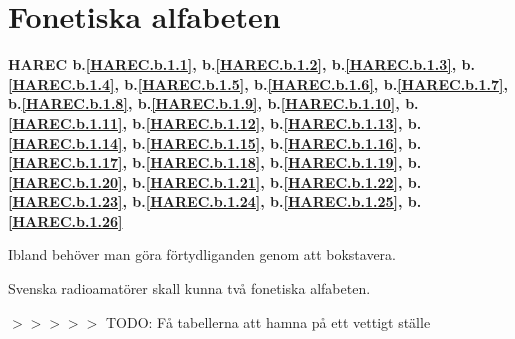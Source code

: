 \section{Fonetiska alfabeten}
\textbf{
HAREC b.\ref{HAREC.b.1.1}\label{myHAREC.b.1.1},
 b.\ref{HAREC.b.1.2}\label{myHAREC.b.1.2},
 b.\ref{HAREC.b.1.3}\label{myHAREC.b.1.3},
 b.\ref{HAREC.b.1.4}\label{myHAREC.b.1.4},
 b.\ref{HAREC.b.1.5}\label{myHAREC.b.1.5},
 b.\ref{HAREC.b.1.6}\label{myHAREC.b.1.6},
 b.\ref{HAREC.b.1.7}\label{myHAREC.b.1.7},
 b.\ref{HAREC.b.1.8}\label{myHAREC.b.1.8},
 b.\ref{HAREC.b.1.9}\label{myHAREC.b.1.9},
 b.\ref{HAREC.b.1.10}\label{myHAREC.b.1.10},
 b.\ref{HAREC.b.1.11}\label{myHAREC.b.1.11},
 b.\ref{HAREC.b.1.12}\label{myHAREC.b.1.12},
 b.\ref{HAREC.b.1.13}\label{myHAREC.b.1.13},
 b.\ref{HAREC.b.1.14}\label{myHAREC.b.1.14},
 b.\ref{HAREC.b.1.15}\label{myHAREC.b.1.15},
 b.\ref{HAREC.b.1.16}\label{myHAREC.b.1.16},
 b.\ref{HAREC.b.1.17}\label{myHAREC.b.1.17},
 b.\ref{HAREC.b.1.18}\label{myHAREC.b.1.18},
 b.\ref{HAREC.b.1.19}\label{myHAREC.b.1.19},
 b.\ref{HAREC.b.1.20}\label{myHAREC.b.1.20},
 b.\ref{HAREC.b.1.21}\label{myHAREC.b.1.21},
 b.\ref{HAREC.b.1.22}\label{myHAREC.b.1.22},
 b.\ref{HAREC.b.1.23}\label{myHAREC.b.1.23},
 b.\ref{HAREC.b.1.24}\label{myHAREC.b.1.24},
 b.\ref{HAREC.b.1.25}\label{myHAREC.b.1.25},
 b.\ref{HAREC.b.1.26}\label{myHAREC.b.1.26}
}

Ibland behöver man göra förtydliganden genom att bokstavera.

Svenska radioamatörer skall kunna två fonetiska alfabeten.

$>>>>>$ TODO: Få tabellerna att hamna på ett vettigt ställe

